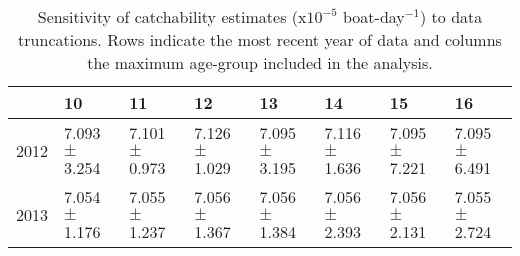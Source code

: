 \begin{sidewaystable}[ht]
\centering
\begin{tabular}{rlllllll}
  \hline
 & 10 & 11 & 12 & 13 & 14 & 15 & 16 \\ 
  \hline
2012 & 7.093 $\pm$ 3.254 & 7.101 $\pm$ 0.973 & 7.126 $\pm$ 1.029 & 7.095 $\pm$ 3.195 & 7.116 $\pm$ 1.636 & 7.095 $\pm$ 7.221 & 7.095 $\pm$ 6.491 \\ 
  2013 & 7.054 $\pm$ 1.176 & 7.055 $\pm$ 1.237 & 7.056 $\pm$ 1.367 & 7.056 $\pm$ 1.384 & 7.056 $\pm$ 2.393 & 7.056 $\pm$ 2.131 & 7.055 $\pm$ 2.724 \\ 
   \hline
\end{tabular}
\caption{Sensitivity of catchability estimates (x$10^{-5}$ boat-day$^{-1}$) to data truncations. Rows indicate the most recent year of data and columns the maximum age-group included in the analysis.} 
\label{tab:Sensitivity-CatchabilityToMulletDataTruncation}
\end{sidewaystable}
